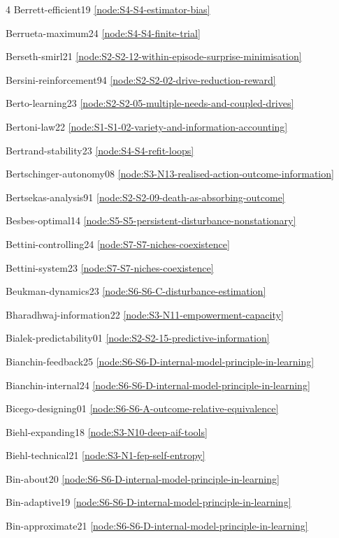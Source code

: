 \documentclass[10pt]{article}
\begin{document}
{\begin{multicols}{4}
Berrett-efficient19 \hfill \ref{node:S4-S4-estimator-bias}\par
Berrueta-maximum24 \hfill \ref{node:S4-S4-finite-trial}\par
Berseth-smirl21 \hfill \ref{node:S2-S2-12-within-episode-surprise-minimisation}\par
Bersini-reinforcement94 \hfill \ref{node:S2-S2-02-drive-reduction-reward}\par
Berto-learning23 \hfill \ref{node:S2-S2-05-multiple-needs-and-coupled-drives}\par
Bertoni-law22 \hfill \ref{node:S1-S1-02-variety-and-information-accounting}\par
Bertrand-stability23 \hfill \ref{node:S4-S4-refit-loops}\par
Bertschinger-autonomy08 \hfill \ref{node:S3-N13-realised-action-outcome-information}\par
Bertsekas-analysis91 \hfill \ref{node:S2-S2-09-death-as-absorbing-outcome}\par
Besbes-optimal14 \hfill \ref{node:S5-S5-persistent-disturbance-nonstationary}\par
Bettini-controlling24 \hfill \ref{node:S7-S7-niches-coexistence}\par
Bettini-system23 \hfill \ref{node:S7-S7-niches-coexistence}\par
Beukman-dynamics23 \hfill \ref{node:S6-S6-C-disturbance-estimation}\par
Bharadhwaj-information22 \hfill \ref{node:S3-N11-empowerment-capacity}\par
Bialek-predictability01 \hfill \ref{node:S2-S2-15-predictive-information}\par
Bianchin-feedback25 \hfill \ref{node:S6-S6-D-internal-model-principle-in-learning}\par
Bianchin-internal24 \hfill \ref{node:S6-S6-D-internal-model-principle-in-learning}\par
Bicego-designing01 \hfill \ref{node:S6-S6-A-outcome-relative-equivalence}\par
Biehl-expanding18 \hfill \ref{node:S3-N10-deep-aif-tools}\par
Biehl-technical21 \hfill \ref{node:S3-N1-fep-self-entropy}\par
Bin-about20 \hfill \ref{node:S6-S6-D-internal-model-principle-in-learning}\par
Bin-adaptive19 \hfill \ref{node:S6-S6-D-internal-model-principle-in-learning}\par
Bin-approximate21 \hfill \ref{node:S6-S6-D-internal-model-principle-in-learning}\par

\end{multicols}}
\end{document}
